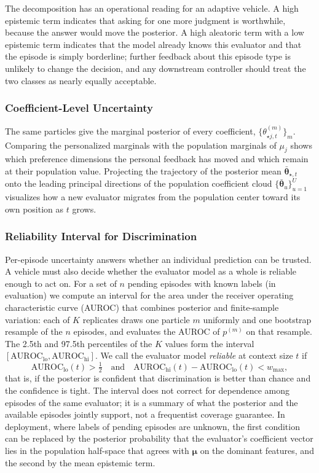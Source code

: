 \documentclass[lettersize,journal]{IEEEtran}
\newcommand{\newuser}{\star}
\begin{document}
The decomposition has an operational reading for an adaptive vehicle. A high epistemic term indicates that asking for one more judgment is worthwhile, because the answer would move the posterior. A high aleatoric term with a low epistemic term indicates that the model already knows this evaluator and that the episode is simply borderline; further feedback about this episode type is unlikely to change the decision, and any downstream controller should treat the two classes as nearly equally acceptable.

\subsubsection{Coefficient-Level Uncertainty}
The same particles give the marginal posterior of every coefficient, $\{\theta^{(m)}_{\newuser j,t}\}_m$. Comparing the personalized marginals with the population marginals of $\mu_j$ shows which preference dimensions the personal feedback has moved and which remain at their population value. Projecting the trajectory of the posterior mean $\bar{\bm\theta}_{\newuser,t}$ onto the leading principal directions of the population coefficient cloud $\{\bar{\bm\theta}_u\}_{u=1}^{U}$ visualizes how a new evaluator migrates from the population center toward its own position as $t$ grows.

\subsubsection{Reliability Interval for Discrimination}
\label{sec:trust}
Per-episode uncertainty answers whether an individual prediction can be trusted. A vehicle must also decide whether the evaluator model as a whole is reliable enough to act on. For a set of $n$ pending episodes with known labels (in evaluation) we compute an interval for the area under the receiver operating characteristic curve (AUROC) that combines posterior and finite-sample variation: each of $K$ replicates draws one particle $m$ uniformly and one bootstrap resample of the $n$ episodes, and evaluates the AUROC of $p^{(m)}$ on that resample. The 2.5th and 97.5th percentiles of the $K$ values form the interval $[\mathrm{AUROC}_{\mathrm{lo}},\mathrm{AUROC}_{\mathrm{hi}}]$. We call the evaluator model \emph{reliable} at context size $t$ if
\begin{equation}
 \mathrm{AUROC}_{\mathrm{lo}}(t)>\tfrac12
 \quad\text{and}\quad
 \mathrm{AUROC}_{\mathrm{hi}}(t)-\mathrm{AUROC}_{\mathrm{lo}}(t)<w_{\max},
 \label{eq:reliable}
\end{equation}
that is, if the posterior is confident that discrimination is better than chance and the confidence is tight. The interval does not correct for dependence among episodes of the same evaluator; it is a summary of what the posterior and the available episodes jointly support, not a frequentist coverage guarantee. In deployment, where labels of pending episodes are unknown, the first condition can be replaced by the posterior probability that the evaluator's coefficient vector lies in the population half-space that agrees with $\bm\mu$ on the dominant features, and the second by the mean epistemic term.
\end{document}
